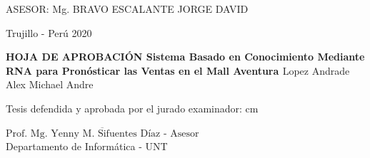 \pagestyle{plain}
%
\hspace*{6cm}
\vskip 9cm
\begin{center}
\end{center} 
\newpage
%
%
\begin{center}
   {\bf {\fontsize{14}{16.8}\selectfont{PAUL DENIS SANCHEZ RODRIGUEZ}}}   
\end{center}   

\vskip 3.2cm
\begin{center}
   {\bf \doublespacing {\fontsize{17}{20.4}\selectfont{SISTEMA BASADO EN CONOCIMIENTO MEDIANTE RNA PARA PRONÓSTICAR LAS VENTAS EN EL MALL AVENTURA }}}     
\end{center}   
  \vskip 2cm
\begin{verse}
 \fontsize{12}{14.4}
\end{verse}
%
\vskip 1.5cm 
{\fontsize{14}{16.8}\selectfont ASESOR: Mg. BRAVO ESCALANTE JORGE DAVID} 
 \vskip 1cm 
 \begin{center}    
 \vskip 2cm
{\fontsize{14}{16.8}\selectfont Trujillo - Perú
\vskip 0.2cm
\hspace*{-0.2cm} 
2020}
\end{center} 
\newpage
%
\begin{center}
 {\bf {\Large HOJA DE APROBACIÓN }     
 \vskip 1.5cm
  {\Large Sistema Basado en Conocimiento Mediante RNA para Pronósticar las Ventas en el Mall Aventura }}
 \vskip 1cm 
  \large{Lopez Andrade Alex Michael Andre}
 \vskip 1cm
\end{center} 
Tesis defendida y aprobada por el jurado examinador:
 cm
\begin{flushleft} 
$\overline{\mbox{Prof. Mg. Yenny M. Sifuentes Díaz - Asesor}}$\\
\vskip -0.5cm
Departamento de Informática - UNT
\end{flushleft} 
